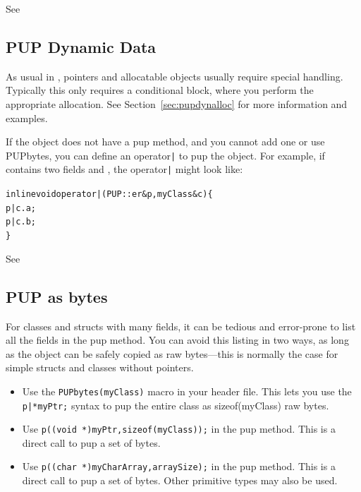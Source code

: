 See 

\subsection{PUP Dynamic Data}
As usual in \CC{}, pointers and allocatable objects usually require special handling. 
Typically this only requires a  conditional block, 
where you perform the appropriate allocation.  See 
Section~\ref{sec:pupdynalloc} for more information and examples.  

If the object does not have a pup method, and you cannot add one or use 
PUPbytes, you can define an operator\verb.|. to pup the object.
For example, if  contains two fields  and , the 
operator\verb.|. might look like:

\begin{alltt}
  inline void operator|(PUP::er &p,myClass &c) \{
    p|c.a;
    p|c.b;
  \}
\end{alltt}

See 

\subsection{PUP as bytes}

\label{sec:pupbytes}

For classes and structs with many fields, it can be tedious and 
error-prone to list all the fields in the pup method.
You can avoid this listing in two ways, as long as the
object can be safely copied as raw bytes---this is normally 
the case for simple structs and classes without pointers.

\begin{itemize}
\item Use the \verb.PUPbytes(myClass). macro in your header file.
      This lets you use the \verb.p|*myPtr;. syntax 
      to pup the entire class as sizeof(myClass) raw bytes.

\item Use \verb.p((void *)myPtr,sizeof(myClass));. in the pup 
      method.  This is a direct call to pup a set of bytes. 
      
\item Use \verb.p((char *)myCharArray,arraySize);. in the pup 
      method.  This is a direct call to pup a set of bytes. 
	  Other primitive types may also be used.
      
\end{itemize}

